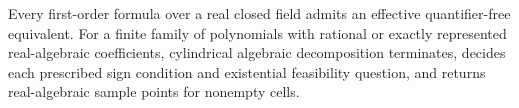 Every first-order formula over a real closed field admits an effective quantifier-free equivalent.  For a finite family of polynomials with rational or exactly represented real-algebraic coefficients, cylindrical algebraic decomposition terminates, decides each prescribed sign condition and existential feasibility question, and returns real-algebraic sample points for nonempty cells.